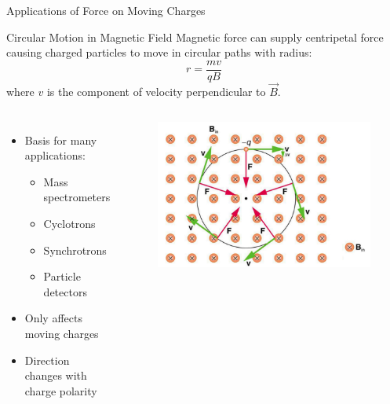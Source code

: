 \documentclass{beamer}
\begin{document}
\begin{frame}{Applications of Force on Moving Charges}
\begin{block}{Circular Motion in Magnetic Field}
Magnetic force can supply centripetal force causing charged particles to move in circular paths with radius:
\begin{equation}
r = \frac{mv}{qB}
\end{equation}
where $v$ is the component of velocity perpendicular to $\vec{B}$.
\end{block}

\begin{columns}
\begin{itemize}
\item Basis for many applications:
  \begin{itemize}
  \item Mass spectrometers
  \item Cyclotrons
  \item Synchrotrons
  \item Particle detectors
  \end{itemize}
\item Only affects moving charges
\item Direction changes with charge polarity
\end{itemize}

\begin{figure}
    \centering
    \includegraphics[width=1\linewidth]{mggmgcrc.png}
\end{figure}
\end{columns}
\end{frame}
\end{document}
